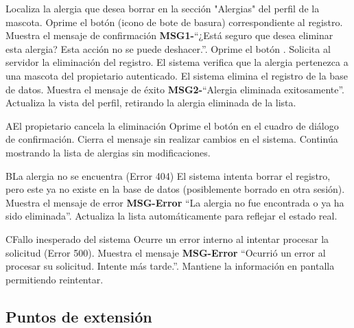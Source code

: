 \begin{UCtrayectoria}
    \UCpaso[\UCactor] Localiza la alergia que desea borrar en la sección "Alergias" del perfil de la mascota.
    \UCpaso[\UCactor] Oprime el botón  (icono de bote de basura) correspondiente al registro.
    \UCpaso Muestra el mensaje de confirmación {\bf MSG1-}``¿Está seguro que desea eliminar esta alergia? Esta acción no se puede deshacer.''.
    \UCpaso[\UCactor] Oprime el botón .
    \UCpaso Solicita al servidor la eliminación del registro.
    \UCpaso El sistema verifica que la alergia pertenezca a una mascota del propietario autenticado.
    \UCpaso El sistema elimina el registro de la base de datos.
    \UCpaso Muestra el mensaje de éxito {\bf MSG2-}``Alergia eliminada exitosamente''.
    \UCpaso Actualiza la vista del perfil, retirando la alergia eliminada de la lista.
\end{UCtrayectoria}


\begin{UCtrayectoriaA}{A}{El propietario cancela la eliminación}
    \UCpaso[\UCactor] Oprime el botón  en el cuadro de diálogo de confirmación.
    \UCpaso Cierra el mensaje sin realizar cambios en el sistema.
    \UCpaso Continúa mostrando la lista de alergias sin modificaciones.
\end{UCtrayectoriaA}

\begin{UCtrayectoriaA}{B}{La alergia no se encuentra (Error 404)}
    \UCpaso El sistema intenta borrar el registro, pero este ya no existe en la base de datos (posiblemente borrado en otra sesión).
    \UCpaso Muestra el mensaje de error {\bf MSG-Error} ``La alergia no fue encontrada o ya ha sido eliminada''.
    \UCpaso Actualiza la lista automáticamente para reflejar el estado real.
\end{UCtrayectoriaA}

\begin{UCtrayectoriaA}{C}{Fallo inesperado del sistema}
    \UCpaso Ocurre un error interno al intentar procesar la solicitud (Error 500).
    \UCpaso Muestra el mensaje {\bf MSG-Error} ``Ocurrió un error al procesar su solicitud. Intente más tarde.''.
    \UCpaso Mantiene la información en pantalla permitiendo reintentar.
\end{UCtrayectoriaA}

\subsection{Puntos de extensión}
